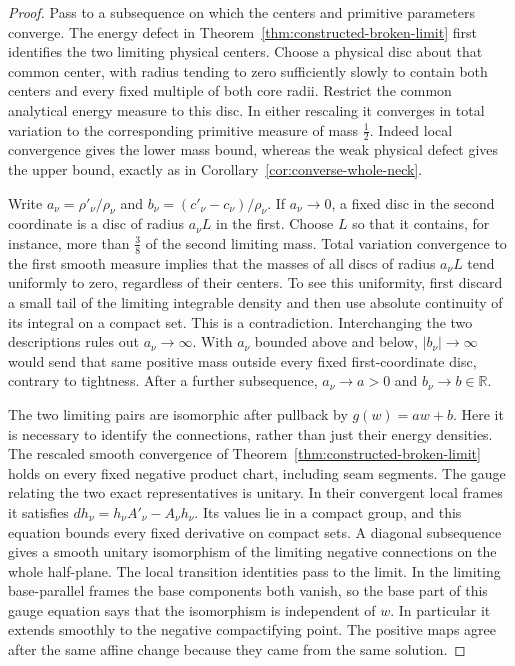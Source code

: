 \documentclass[11pt]{amsart}
\theoremstyle{definition}
\theoremstyle{remark}
\theoremstyle{plain}
\newcommand{\RR}{\mathbb{R}}
\begin{document}
\begin{proof}
Pass to a subsequence on which the centers and primitive
parameters converge. The energy defect in
Theorem~\ref{thm:constructed-broken-limit} first identifies
the two limiting physical centers. Choose a physical
disc about that common center, with radius tending to
zero sufficiently slowly to contain both centers and
every fixed multiple of both core radii. Restrict the
common analytical energy measure to this disc.
In either rescaling it converges in total variation
to the corresponding primitive measure of mass $\frac12$.
Indeed local convergence gives the lower mass bound,
whereas the weak physical defect gives the upper bound,
exactly as in Corollary~\ref{cor:converse-whole-neck}.

Write $a_\nu=\rho'_\nu/\rho_\nu$ and
$b_\nu=(c'_\nu-c_\nu)/\rho_\nu$.
If $a_\nu\to0$, a fixed disc in the second coordinate
is a disc of radius $a_\nu L$ in the first.
Choose $L$ so that it contains, for instance, more than
$\frac38$ of the second limiting mass.
Total variation convergence to the first smooth measure
implies that the masses of all discs of radius $a_\nu L$
tend uniformly to zero, regardless of their centers.
To see this uniformity, first discard a small tail of
the limiting integrable density and then use absolute
continuity of its integral on a compact set.
This is a contradiction. Interchanging the two
descriptions rules out $a_\nu\to\infty$.
With $a_\nu$ bounded above and below, $|b_\nu|\to\infty$
would send that same positive mass outside every fixed
first-coordinate disc, contrary to tightness.
After a further subsequence, $a_\nu\to a>0$ and
$b_\nu\to b\in\RR$.

The two limiting pairs are isomorphic after pullback
by $g(w)=aw+b$. Here it is necessary to identify the
connections, rather than just their energy densities.
The rescaled smooth convergence of
Theorem~\ref{thm:constructed-broken-limit} holds on every
fixed negative product chart, including seam segments.
The gauge relating the two exact representatives is
unitary. In their convergent local frames it satisfies
$dh_\nu=h_\nu A'_\nu-A_\nu h_\nu$.
Its values lie in a compact group, and this equation
bounds every fixed derivative on compact sets.
A diagonal subsequence gives a smooth unitary
isomorphism of the limiting negative connections on
the whole half-plane. The local transition identities
pass to the limit. In the limiting base-parallel frames
the base components both vanish, so the base part of
this gauge equation says that the isomorphism is
independent of $w$. In particular it extends smoothly
to the negative compactifying point. The positive maps agree after the
same affine change because they came from the same
solution.


\end{proof}
\end{document}
